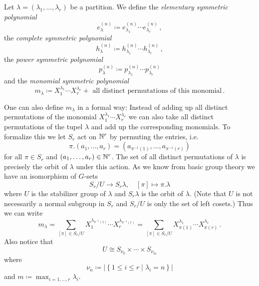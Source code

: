 \begin{definition}
  Let $\lambda = (\lambda_1, \dotsc, \lambda_r)$ be a partition. We define the \emph{elementary symmetric polynomial}
  \[
              e^{(n)}_\lambda
    \coloneqq e^{(n)}_{\lambda_1} \dotsm e^{(n)}_{\lambda_r} \,,
  \]
  the \emph{complete symmetric polynomial}
  \[
              h^{(n)}_\lambda
    \coloneqq h^{(n)}_{\lambda_1} \dotsm h^{(n)}_{\lambda_r} \,,
  \]
  the \emph{power symmetric polynomial}
  \[
              p^{(n)}_\lambda
    \coloneqq p^{(n)}_{\lambda_1} \dotsm p^{(n)}_{\lambda_r}
  \]
  and the \emph{monomial symmetric polynomial}
  \[
              m_\lambda
    \coloneqq   X_1^{\lambda_1} \dotsm X_r^{\lambda_r}
              + \text{ all distinct permutations of this monomial} \,.
  \]
\end{definition}


One can also define $m_\lambda$ in a formal way:
Instead of adding up all distinct permutations of the monomial $X_1^{\lambda_1} \dotsm X_r^{\lambda_r}$ we can also take all distinct permutations of the tupel $\lambda$ and add up the corresponding monomials.
To formalize this we let $S_r$ act on $\mathbb{N}^r$ by permuting the entries, i.e.\
\[
    \pi.(a_1, \dotsc, a_r)
  = \left( a_{\pi^{-1}(1)}, \dotsc, a_{\pi^{-1}(r)} \right)
\]
for all $\pi \in S_r$ and $(a_1, \dotsc, a_r) \in \mathbb{N}^r$.
The set of all distinct permutations of $\lambda$ is precisely the orbit of $\lambda$ under this action.
As we know from basic group theory we have an isomorphism of $G$-sets
\[
          S_r / U
  \to     S_r \lambda,
  \quad   [\pi]
  \mapsto \pi.\lambda
\]
where $U$ is the stabilizer group of $\lambda$ and $S_r \lambda$ is the orbit of $\lambda$.
(Note that $U$ is not necessarily a normal subgroup in $S_r$ and $S_r/U$ is only the set of left cosets.)
Thus we can write
\[
    m_\lambda
  = \sum_{[\pi] \in S_r/U} X_1^{\lambda_{\pi^{-1}(1)}} \dotsm X_r^{\lambda_{\pi^{-1}(r)}}
  = \sum_{[\pi] \in S_r/U} X_{\pi(1)}^{\lambda_1} \dotsm X_{\pi(r)}^{\lambda_r} \,.
\]
Also notice that
\[
        U
  \cong S_{\nu_0} \times \dotsb \times S_{\nu_m}
\]
where
\[
            \nu_n
  \coloneqq \left|
              \left\{
                1 \leq i \leq r
              \mid
                  \lambda_i
                = n
              \right\}
            \right|
\]
and $m \coloneqq \max_{i=1,\dotsc,r} \lambda_i$.


